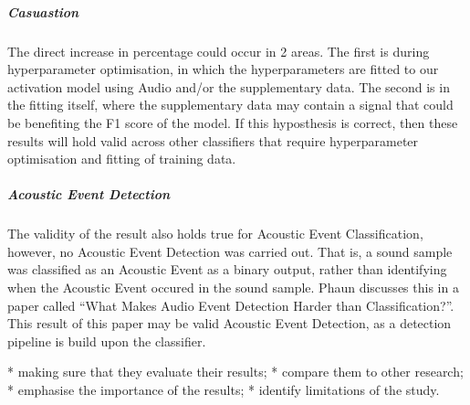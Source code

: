 \documentclass{UoNMCHA}
\newcommand{\inlineQuote}[1]{``#1''}
\numberwithin{equation}{section}
\begin{document}
\subparagraph{Casuastion}
The direct increase in percentage could occur in 2 areas. The first is during hyperparameter optimisation, in which the hyperparameters are fitted to our activation model using Audio and/or the supplementary data. The second is in the fitting itself, where the supplementary data may contain a signal that could be benefiting the F1 score of the model. If this hyposthesis is correct, then these results will hold valid across other classifiers that require hyperparameter optimisation and fitting of training data.

\subparagraph{Acoustic Event Detection}
The validity of the result also holds true for Acoustic Event Classification, however, no Acoustic Event Detection was carried out. That is, a sound sample was classified as an Acoustic Event as a binary output, rather than identifying when the Acoustic Event occured in the sound sample. Phaun discusses this in a paper called \inlineQuote{What Makes Audio Event Detection Harder than Classification?}\cite{Phan2016}. This result of this paper may be valid Acoustic Event Detection, as a detection pipeline is build upon the classifier.


* making sure that they evaluate their results;
* compare them to other research;
* emphasise the importance of the results;
* identify limitations of the study.
\end{document}
